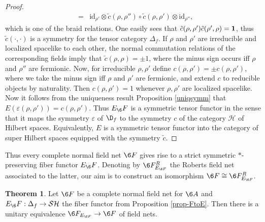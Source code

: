 \documentclass[11pt]{article}
\theoremstyle{definition}
\newtheorem{thm}{Theorem}[section]
\theoremstyle{definition}
\theoremstyle{remark}
\newcommand{\ve}{\varepsilon}
\def\2#1{{\mathcal #1}}
\def\1#1{{\bf #1}}
\newcommand{\rarr}{\rightarrow}
\def\id{\mathrm{id}}
\begin{document}
\begin{proof}
\begin{eqnarray*}
   &=& \id_{\rho'}\otimes\tilde{c}(\rho,\rho'')\circ\tilde{c}(\rho,\rho')\otimes\id_{\rho''},
\end{eqnarray*}
which is one of the braid relations. One easily sees that
$\tilde{c}(\rho,\rho')\tilde{c}(\rho',\rho)=\11$, thus $\tilde{c}(\cdot,\cdot)$ is a symmetry for
the tensor category $\Delta_f$. If $\rho$ and $\rho'$ are irreducible and localized spacelike to
each other, the normal commutation relations of the corresponding fields imply that
$\tilde{c}(\rho,\rho)=\pm 1$, where the minus sign occurs iff $\rho$ and $\rho''$ are
fermionic. Now, for irreducible $\rho,\rho'$ define $c(\rho,\rho')=\pm c(\rho,\rho')$, where we take
the minus sign iff $\rho$ and $\rho'$ are fermionic, and extend $c$ to reducible objects by
naturality. Then $c(\rho,\rho')=1$ whenever $\rho,\rho'$ are localized spacelike. Now it follows
from the uniqueness result Proposition \ref{uniqsymm} that $E(\ve(\rho,\rho'))=c(\rho,\rho')$. 
Thus $E_\6F$ is a symmetric tensor functor in the sense that it maps the symmetry $\ve$ of $\D_f$ to
the symmetry $c$ of the category $\2H$ of Hilbert spaces. Equivalently, $E$ is a symmetric tensor
functor into the category of super Hilbert spaces equipped with the symmetry $\widetilde{c}$.
\end{proof}

Thus every complete normal field net $\6F$ gives rise to a strict symmetric $*$-preserving fiber
functor $E_\6F$. Denoting by $\6F^R_{E_{\6F}}$ the Roberts field net associated to the latter, our
aim is to construct an isomorphism $\6F\cong\6F^R_{E_{\6F}}$. 

\begin{thm} Let $\6F$ be a complete normal field net for $\6A$ and $E_\6F:\Delta_f\rarr\2S\2H$ the fiber
functor from Proposition \ref{prop-FtoE}. Then there is a unitary equivalence
$\6F_{E_{\6F}}\rarr\6F$ of field nets.
\end{thm}
\end{document}
